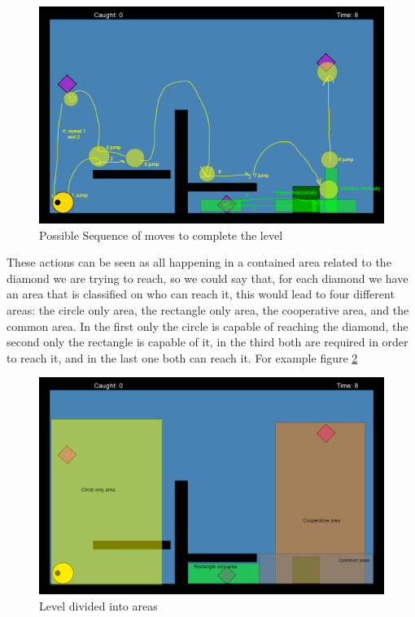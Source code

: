 \documentclass[runningheads]{llncs}
\begin{document}
\begin{figure}
    \centering
    \includegraphics[scale=0.20]{images/levelexamplesolution.png}
    \caption{Possible Sequence of moves to complete the level}
    \label{fig:levelsolution}
\end{figure}

These actions can be seen as all happening in a contained area related to the diamond we are trying to reach, so we could say that, for each diamond we have an area that is classified on who can reach it, this would lead to four different areas: the circle only area, the rectangle only area, the cooperative area, and the common area. In the first only the circle is capable of reaching the diamond, the second only the rectangle is capable of it, in the third both are required in order to reach it, and in the last one both can reach it. For example figure \ref{fig:levelareas}

\begin{figure}
    \centering
    \includegraphics[scale=0.20]{images/lelvelexampleareas.png}
    \caption{Level divided into areas}
    \label{fig:levelareas}
\end{figure}
\end{document}
